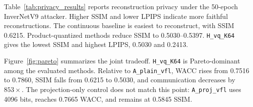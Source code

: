 \documentclass{article}
\begin{document}
Table~\ref{tab:privacy_results} reports reconstruction privacy under the 50-epoch InverNetV9 attacker. Higher SSIM and lower LPIPS indicate more faithful reconstructions. The continuous baseline is easiest to reconstruct, with SSIM 0.6215. Product-quantized methods reduce SSIM to 0.5030--0.5397. \texttt{H\_vq\_K64} gives the lowest SSIM and highest LPIPS, 0.5030 and 0.2413.

\begin{table}[H]
\caption{Reconstruction privacy results under InverNetV9. SSIM and LPIPS are averaged over two seeds and all 5,067 validation samples per seed. Lower SSIM and higher LPIPS indicate weaker reconstruction.}
\label{tab:privacy_results}
\centering
\scriptsize
\setlength{\tabcolsep}{3pt}
\end{table}

Figure~\ref{fig:pareto} summarizes the joint tradeoff. \texttt{H\_vq\_K64} is Pareto-dominant among the evaluated methods. Relative to \texttt{A\_plain\_vfl}, WACC rises from 0.7516 to 0.7860, SSIM falls from 0.6215 to 0.5030, and communication decreases by $853\times$. The projection-only control does not match this point: \texttt{A\_proj\_vfl} uses 4096 bits, reaches 0.7665 WACC, and remains at 0.5845 SSIM.
\end{document}
